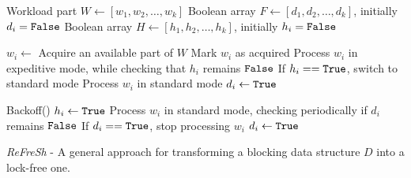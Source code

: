 \begin{algorithm}[htbp]
    \footnotesize
    \vspace*{2mm}
    
    \begin{algorithmic}[1]
    
        \State Workload part $\mathit{W} \gets [w_1, w_2, \ldots, w_k]$ \label{alg:refresh:w}
        \State Boolean array $\mathit{F} \gets [d_1, d_2, \ldots, d_k]$, initially $d_i = \mbox{\texttt{False}}$ \label{alg:refresh:d}
        \State Boolean array $\mathit{H} \gets [h_1, h_2, \ldots, h_k]$, initially $h_i = \mbox{\texttt{False}}$ \label{alg:refresh:h}
    \EndProcedure
    
    \vspace*{1mm}
    \vspace*{1mm}
    
          \label{alg:refresh:process:start}
            \State $\mathit{w_i} \gets$ Acquire an available part of $\mathit{W}$
            \State Mark $\mathit{w_i}$ as acquired
              \label{alg:refresh:process:if}
                \State Process $\mathit{w_i}$ in expeditive mode, while checking that $h_i$ remains $\mbox{\texttt{False}}$ \label{alg:refresh:process:expeditive}
                \State If $h_i == \mbox{\texttt{True}}$, switch to standard mode
            \Else
                \State Process $\mathit{w_i}$ in standard mode \label{alg:refresh:process:standard}
            \EndIf
            \State $d_i \gets \mbox{\texttt{True}}$ \label{alg:refresh:d:true}
        \EndWhile
        
        \vspace*{1mm}
          \label{alg:refresh:scan:ForAll} 
            \State Backoff()   \label{alg:refresh:help:backoff}
              \label{alg:refresh:help:if}
                \State $h_i \gets \mbox{\texttt{True}}$ \label{alg:refresh:h:true}
                \State Process $\mathit{w_i}$ in standard mode, checking periodically if $d_i$ remains $\mbox{\texttt{False}}$ \label{alg:refresh:help:process}
                \State If $d_i == \mbox{\texttt{True}}$, stop processing $\mathit{w_i}$
                \State $d_i \gets \mbox{\texttt{True}}$ \label{alg:refresh:help:d:true}
            \EndIf
        \EndFor
    \EndProcedure
    
    \end{algorithmic}
    
    \caption{\textit{ReFreSh} - A general approach for transforming a blocking data structure $\mathit{D}$ into a lock-free one.}
    \label{alg:refresh}
\end{algorithm}

